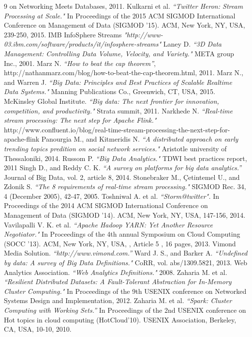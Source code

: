 \documentclass[a4paper, 12pt]{report}
\numberwithin{equation}{section}
\begin{document}
\begin{thebibliography}{9}
on Networking Meets Databases, 2011.
	 Kulkarni et al.
	\emph{``Twitter Heron: Stream Processing at Scale."} In Proceedings of the 2015 ACM SIGMOD International Conference on Management of Data (SIGMOD '15). ACM, New York, NY, USA, 239-250, 2015. 
	 IMB InfoSphere Streams
	\emph{"http://www-03.ibm.com/software/products/it/infosphere-streams"}
    Laney D. 
    \emph{``3D Data Management: Controlling Data Volume, Velocity, and Variety."} META group Inc., 2001.
    Marz N. 
    \emph{``How to beat the cap theorem''}, http://nathanmarz.com/blog/how-to-beat-the-cap-theorem.html, 2011.
    Marz N., and Warren J. 
    \emph{``Big Data: Principles and Best Practices of Scalable Realtime Data Systems."} Manning Publications Co., Greenwich, CT, USA, 2015.
     McKinsley Global Institute.
    \emph{``Big data: The next frontier for innovation, competition, and productivity."} Strata summit, 2011.
     Narkhede N.
    \emph{``Real-time stream processing: The next step for Apache Flink."}
    http://www.confluent.io/blog/real-time-stream-processing-the-next-step-for-apache-flink
    Panourgia M., and Kitmeridis N. 
    \emph{``A distributed approach on early trending topics predition on social network services."} Aristotle university of Thessaloniki, 2014.
    Russom P.
    \emph{``Big Data Analytics."} TDWI best practices report, 2011
    Singh D., and Reddy C. K.
     \emph{``A survey on platforms for big data analytics.”} Journal of Big Data, vol. 2, article 8, 2014.
     Stonebraker M., \c{C}etintemel U., and Zdonik S.
    \emph{``The 8 requirements of real-time stream processing."} SIGMOD Rec. 34, 4 (December 2005), 42-47, 2005.
     Toshniwal A. et al.
    \emph{``Storm@twitter".}
    In Proceedings of the 2014 ACM SIGMOD International Conference on Management of Data (SIGMOD '14). ACM, New York, NY, USA, 147-156, 2014.
    Vavilapalli V. K. et al.
	\emph{``Apache Hadoop YARN: Yet Another Resource Negotiator."} In Proceedings of the 4th annual Symposium on Cloud Computing (SOCC '13). ACM, New York, NY, USA, , Article 5 , 16 pages, 2013.
    Vimond Media Solution.
    \emph{``http://www.vimond.com.''}
    Ward J. S., and Barker A. 
    \emph{``Undefined by data: A survey of Big Data Definitions."} CoRR, vol. abs/1309.5821, 2013.
    Web Analytics Association. 
    \emph{``Web Analytics Definitions."} 2008.
     Zaharia M. et al.
    \emph{``Resilient Distributed Datasets: A Fault-Tolerant Abstraction for In-Memory Cluster Computing."} In Proceedings of the 9th USENIX conference on Networked Systems Design and Implementation, 2012.
     Zaharia M. et al. 
    \emph{``Spark: Cluster Computing with Working Sets.''} In Proceedings of the 2nd USENIX conference on Hot topics in cloud computing (HotCloud'10). USENIX Association, Berkeley, CA, USA, 10-10, 2010.	
\end{thebibliography}


\end{document}
